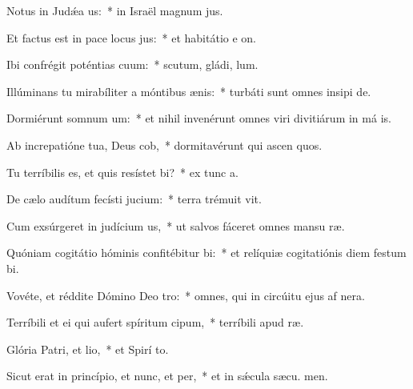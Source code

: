 \item Notus in Judǽa us:~* in Israël magnum  jus.
\item Et factus est in pace locus jus:~* et habitátio e  on.
\item Ibi confrégit poténtias cuum:~* scutum, gládi,  lum.
\item Illúminans tu mirabíliter a móntibus ænis:~* turbáti sunt omnes insipi de.
\item Dormiérunt somnum um:~* et nihil invenérunt omnes viri divitiárum in má is.
\item Ab increpatióne tua, Deus cob,~* dormitavérunt qui ascen quos.
\item Tu terríbilis es, et quis resístet bi?~* ex tunc  a.
\item De cælo audítum fecísti jucium:~* terra trémuit  vit.
\item Cum exsúrgeret in judícium us,~* ut salvos fáceret omnes mansu ræ.
\item Quóniam cogitátio hóminis confitébitur bi:~* et relíquiæ cogitatiónis diem festum  bi.
\item Vovéte, et réddite Dómino Deo tro:~* omnes, qui in circúitu ejus af nera.
\item Terríbili et ei qui aufert spíritum cipum,~* terríbili apud  ræ.
\item Glória Patri, et lio,~* et Spirí to.
\item Sicut erat in princípio, et nunc, et per,~* et in sǽcula sæcu. men.
